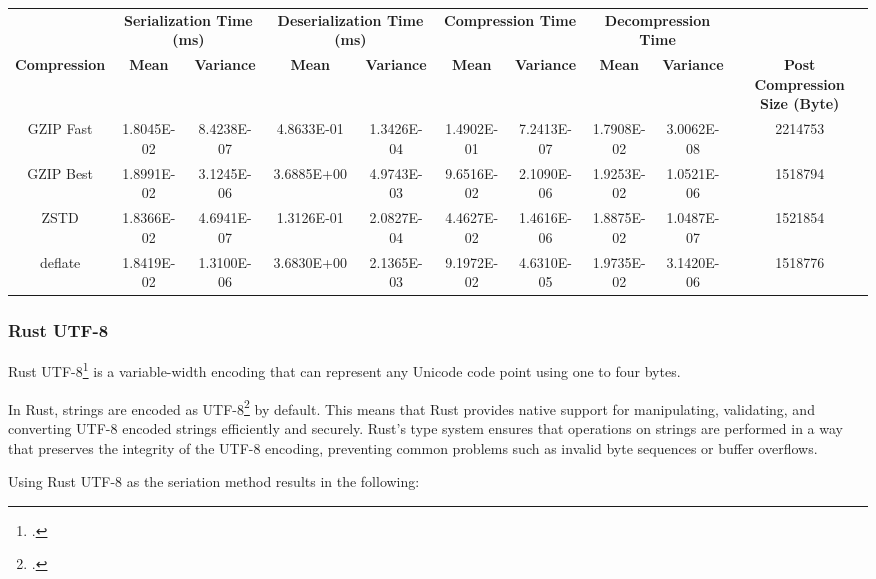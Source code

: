 \begin{table}[h]
\centering
\begin{tabular}{cccccccccc}
\hline
 &
  \multicolumn{2}{c}{\textbf{Serialization Time (ms)}} &
  \multicolumn{2}{c}{\textbf{Deserialization Time (ms)}} &
  \multicolumn{2}{c}{\textbf{Compression Time}} &
  \multicolumn{2}{c}{\textbf{Decompression Time}} &
   \\
\textbf{Compression} & \textbf{Mean}     & \textbf{Variance} & \textbf{Mean}     & \textbf{Variance} & \textbf{Mean}     & \textbf{Variance} & \textbf{Mean}     & \textbf{Variance} & \textbf{Post Compression Size (Byte)} \\
\hline
GZIP Fast           & 1.8045E-02 & 8.4238E-07 & 4.8633E-01 & 1.3426E-04 & 1.4902E-01 & 7.2413E-07 & 1.7908E-02 & 3.0062E-08 & 2214753 \\
GZIP Best           & 1.8991E-02 & 3.1245E-06 & 3.6885E+00 & 4.9743E-03 & 9.6516E-02 & 2.1090E-06 & 1.9253E-02 & 1.0521E-06 & 1518794 \\
ZSTD                & 1.8366E-02 & 4.6941E-07 & 1.3126E-01 & 2.0827E-04 & 4.4627E-02 & 1.4616E-06 & 1.8875E-02 & 1.0487E-07 & 1521854 \\
deflate             & 1.8419E-02 & 1.3100E-06 & 3.6830E+00 & 2.1365E-03 & 9.1972E-02 & 4.6310E-05 & 1.9735E-02 & 3.1420E-06 & 1518776 \\
\hline
\end{tabular}
\end{table}



\subsubsection{Rust UTF-8}
Rust UTF-8\footcite{rust_utf8} is a variable-width encoding that can represent any Unicode code point using one to four bytes.

In Rust, strings are encoded as UTF-8\footcite{utf8} by default. This means that Rust provides native support for manipulating, validating, and converting UTF-8 encoded strings efficiently and securely. Rust's type system ensures that operations on strings are performed in a way that preserves the integrity of the UTF-8 encoding, preventing common problems such as invalid byte sequences or buffer overflows.

Using Rust UTF-8 as the seriation method results in the following:

